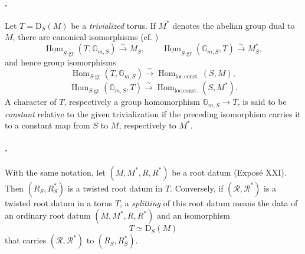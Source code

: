 \paragraph{.}
Let \(T=\mathrm D_S(M)\) be a \emph{trivialized} torus. If \(M^*\)
denotes the abelian group dual to \(M\), there are canonical
isomorphisms (cf. )
\[
  \underline{\operatorname{Hom}}_{S\text{-gr}}
    (T,\mathbb G_{m,S})
  \xrightarrow{\sim} M_S,
  \qquad
  \underline{\operatorname{Hom}}_{S\text{-gr}}
    (\mathbb G_{m,S},T)
  \xrightarrow{\sim} M^*_S,
\]
and hence group isomorphisms
\[
  \operatorname{Hom}_{S\text{-gr}}(T,\mathbb G_{m,S})
  \xrightarrow{\sim}
  \operatorname{Hom}_{\mathrm{loc.const.}}(S,M),
\]
\[
  \operatorname{Hom}_{S\text{-gr}}(\mathbb G_{m,S},T)
  \xrightarrow{\sim}
  \operatorname{Hom}_{\mathrm{loc.const.}}(S,M^*).
\]
A character of \(T\), respectively a group homomorphism
\(\mathbb G_{m,S}\to T\), is said to be \emph{constant} relative to
the given trivialization if the preceding isomorphism carries it to
a constant map from \(S\) to \(M\), respectively to \(M^*\).

\paragraph{.}
With the same notation, let \((M,M^*,R,R^*)\) be a root datum
(Exposé XXI). Then \((R_S,R^*_S)\) is a twisted root datum in \(T\).
Conversely, if \((\mathcal R,\mathcal R^*)\) is a twisted root datum
in a torus \(T\), a \emph{splitting} of this root datum means the
data of an ordinary root datum \((M,M^*,R,R^*)\) and an isomorphism
\[
  T\simeq\mathrm D_S(M)
\]
that carries \((\mathcal R,\mathcal R^*)\) to \((R_S,R^*_S)\).

